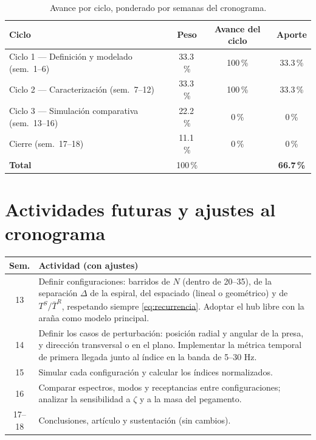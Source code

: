 \documentclass[11pt,letterpaper]{article}
\begin{document}
\begin{table}[H]
\centering\small
\caption{Avance por ciclo, ponderado por semanas del cronograma.}
\begin{tabular}{@{}lccc@{}}
\toprule
Ciclo & Peso & Avance del ciclo & Aporte \\
\midrule
Ciclo 1 --- Definición y modelado (sem.\ 1--6) & 33.3\,\% & 100\,\% & 33.3\,\% \\
Ciclo 2 --- Caracterización (sem.\ 7--12) & 33.3\,\% & 100\,\% & 33.3\,\% \\
Ciclo 3 --- Simulación comparativa (sem.\ 13--16) & 22.2\,\% & 0\,\% & 0\,\% \\
Cierre (sem.\ 17--18) & 11.1\,\% & 0\,\% & 0\,\% \\
\midrule
\textbf{Total} & 100\,\% & & \textbf{66.7\,\%} \\
\bottomrule
\end{tabular}
\end{table}

\section{Actividades futuras y ajustes al cronograma}

\begin{table}[H]
\centering\small
\begin{tabular}{@{}cp{14cm}@{}}
\toprule
Sem. & Actividad (con ajustes) \\
\midrule
13 & Definir configuraciones: barridos de $N$ (dentro de 20--35), de la
separación $\Delta$ de la espiral, del espaciado (lineal o geométrico) y de
$T^S/\bar{T}^R$, respetando siempre \eqref{eq:recurrencia}. Adoptar el hub
libre con la araña como modelo principal. \\
14 & Definir los casos de perturbación: posición radial y angular de la
presa, y dirección transversal o en el plano. Implementar la métrica
temporal de primera llegada junto al índice en la banda de 5--30 Hz. \\
15 & Simular cada configuración y calcular los índices normalizados. \\
16 & Comparar espectros, modos y receptancias entre configuraciones;
analizar la sensibilidad a $\zeta$ y a la masa del pegamento. \\
17--18 & Conclusiones, artículo y sustentación (sin cambios). \\
\bottomrule
\end{tabular}
\end{table}
\end{document}
